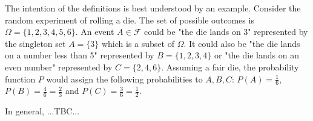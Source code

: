 The intention of the definitions is best understood by an example. Consider the random experiment of rolling a die. The set of possible outcomes is $\Omega = \{1,2,3,4,5,6\}$. An event $A \in \mathcal{F}$ could be "the die lands on 3" represented by the singleton set $A = \{3\}$ which is a subset of $\Omega$. It could also be "the die lands on a number less than 5" represented by $B = \{1,2,3,4\}$ or "the die lands on an even number" represented by $C = \{2,4,6\}$. Assuming a fair die, the probability function $P$ would assign the following probabilities to $A,B,C$: $P(A) = \frac{1}{6}$, $P(B) = \frac{4}{6} = \frac{2}{3}$ and  $P(C) = \frac{3}{6} = \frac{1}{2}$.

\medskip
In general, ...TBC...













